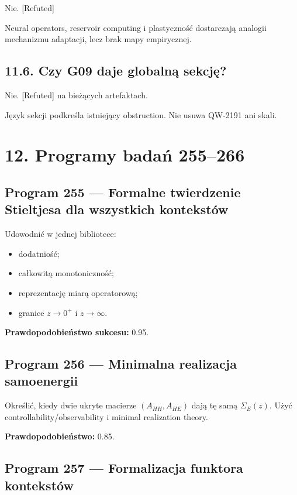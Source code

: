 \documentclass[11pt,a4paper,openany]{report}
\newcommand{\statusRefuted}{\textcolor{finred}{[Refuted]}}
\begin{document}
Nie. \statusRefuted{}

Neural operators, reservoir computing i plastyczność dostarczają analogii mechanizmu adaptacji, lecz brak mapy empirycznej.

\section{11.6. Czy G09 daje globalną sekcję?}

Nie. \statusRefuted{} na bie\.zących artefaktach.

Język sekcji podkreśla istniejący obstruction. Nie usuwa QW-2191 ani skali.

\chapter{12. Programy badań 255--266}

\section{Program 255 --- Formalne twierdzenie Stieltjesa dla wszystkich kontekstów}

Udowodnić w jednej bibliotece:

\begin{itemize}
\item 
dodatniość;

\item 
całkowitą monotoniczność;

\item 
reprezentację miarą operatorową;

\item 
granice \(z\to0^+\) i \(z\to\infty\).

\end{itemize}

\textbf{Prawdopodobieństwo sukcesu:} 0.95.

\section{Program 256 --- Minimalna realizacja samoenergii}

Określić, kiedy dwie ukryte macierze \((A_{HH},A_{HE})\) dają tę samą \(\Sigma_E(z)\). U\.zyć controllability/\allowbreak{}observability i minimal realization theory.

\textbf{Prawdopodobieństwo:} 0.85.

\section{Program 257 --- Formalizacja funktora kontekstów}
\end{document}
